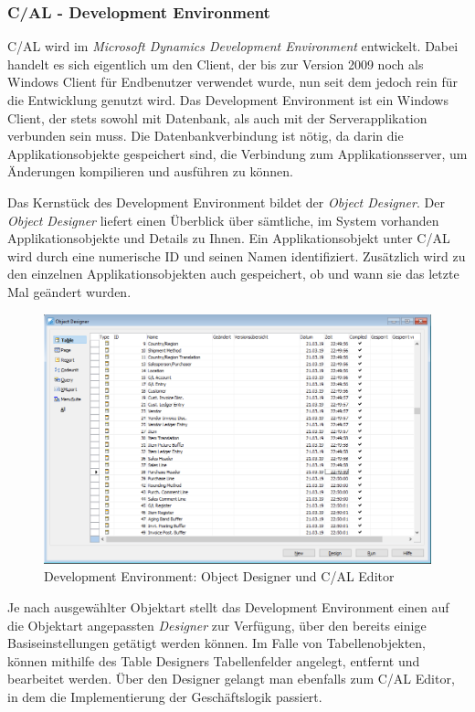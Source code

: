 \subsubsection{C/AL - Development Environment}
C/AL wird im \textit{Microsoft Dynamics Development Environment} entwickelt. Dabei handelt es sich eigentlich um den Client, der bis zur Version 2009 noch als Windows Client für Endbenutzer verwendet wurde, nun seit dem jedoch rein für die Entwicklung genutzt wird. Das Development Environment ist ein Windows Client, der stets sowohl mit Datenbank, als auch mit der Serverapplikation verbunden sein muss. Die Datenbankverbindung ist nötig, da darin die Applikationsobjekte gespeichert sind, die Verbindung zum Applikationsserver, um Änderungen kompilieren und ausführen zu können.
\linebreak

Das Kernstück des Development Environment bildet der \textit{Object Designer}. Der \textit{Object Designer} liefert einen Überblick über sämtliche, im System vorhanden Applikationsobjekte und Details zu Ihnen. Ein Applikationsobjekt unter C/AL wird durch eine numerische ID und seinen Namen identifiziert. Zusätzlich wird zu den einzelnen Applikationsobjekten auch gespeichert, ob und wann sie das letzte Mal geändert wurden.

\begin{figure}[h]
	\centering
	\includegraphics[width=130mm]{images/ObjectDesigner}
	\caption{Development Environment: Object Designer und C/AL Editor}
	\label{fig:ObjectDesigner}
\end{figure}

Je nach ausgewählter Objektart stellt das Development Environment einen auf die Objektart angepassten \textit{Designer} zur Verfügung, über den bereits einige Basiseinstellungen getätigt werden können. Im Falle von Tabellenobjekten, können mithilfe des Table Designers Tabellenfelder angelegt, entfernt und bearbeitet werden. Über den Designer gelangt man ebenfalls zum C/AL Editor, in dem die Implementierung der Geschäftslogik passiert.

